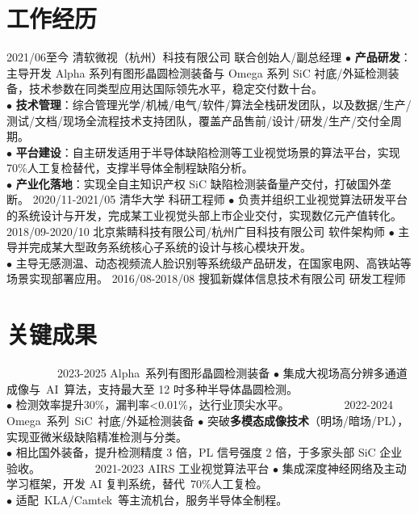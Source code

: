 \documentclass[a4paper,10pt]{professional-cv-cn}
\begin{document}
\section{工作经历}
\begin{entrylist}
    \entry
        {2021/06至今}
        {清软微视（杭州）科技有限公司}
        {联合创始人/副总经理}
        {
            $\bullet$ \textbf{产品研发}：主导开发 Alpha 系列有图形晶圆检测装备与 Omega 系列 SiC 衬底/外延检测装备，技术参数在同类型应用达国际领先水平，稳定交付数十台。
            \\
            $\bullet$ \textbf{技术管理}：综合管理光学/机械/电气/软件/算法全栈研发团队，以及数据/生产/测试/文档/现场全流程技术支持团队，覆盖产品售前/设计/研发/生产/交付全周期。
            \\
            $\bullet$ \textbf{平台建设}：自主研发适用于半导体缺陷检测等工业视觉场景的算法平台，实现70\%人工复检替代，支撑半导体全制程缺陷分析。
            \\
            $\bullet$ \textbf{产业化落地}：实现全自主知识产权 SiC 缺陷检测装备量产交付，打破国外垄断。
        }
    \entry
        {2020/11-2021/05}
        {清华大学}
        {科研工程师}
        {
            $\bullet$ 负责并组织工业视觉算法研发平台的系统设计与开发，完成某工业视觉头部上市企业交付，实现数亿元产值转化。
        }
    \entry
        {2018/09-2020/10}
        {北京紫睛科技有限公司/杭州广目科技有限公司}
        {软件架构师}
        {
            $\bullet$ 主导并完成某大型政务系统核心子系统的设计与核心模块开发。
            \\
            $\bullet$ 主导无感测温、动态视频流人脸识别等系统级产品研发，在国家电网、高铁站等场景实现部署应用。
        }
    \justentry
        {2016/08-2018/08}
        {搜狐新媒体信息技术有限公司}
        {研发工程师}
\end{entrylist}

\section{关键成果}
\begin{entrylist}
    \entry
        {~~~~~~~~~2023-2025}
        {Alpha~系列有图形晶圆检测装备}
        {}
        {
            $\bullet$ 集成大视场高分辨多通道成像与~AI~算法，支持最大至 12 吋多种半导体晶圆检测。
            \\
            $\bullet$ 检测效率提升30\%，漏判率<0.01\%，达行业顶尖水平。
        }
    \entry
        {~~~~~~~~~2022-2024}
        {Omega~系列~SiC~衬底/外延检测装备}
        {}
        {
            $\bullet$ 突破\textbf{多模态成像技术}（明场/暗场/PL），实现亚微米级缺陷精准检测与分类。
            \\
            $\bullet$ 相比国外装备，提升检测精度 3 倍，PL 信号强度 2 倍，于多家头部 SiC 企业验收。
        }
    \entry
        {~~~~~~~~~2021-2023}
        {AIRS 工业视觉算法平台}
        {}
        {
            $\bullet$ 集成深度神经网络及主动学习框架，开发 AI 复判系统，替代~70\%人工复检。
            \\
            $\bullet$ 适配~KLA/Camtek~等主流机台，服务半导体全制程。
        }
\end{entrylist}
\end{document}
